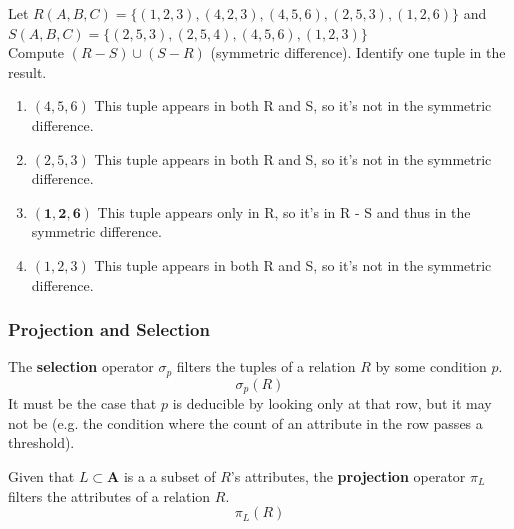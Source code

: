 \documentclass{article}
\begin{document}
      \begin{example}
        Let $R(A,B,C) = \{(1,2,3), (4,2,3), (4,5,6), (2,5,3), (1,2,6)\}$ and\\
        $S(A,B,C) = \{(2,5,3), (2,5,4), (4,5,6), (1,2,3)\}$\\
        Compute $(R - S) \cup (S - R)$ (symmetric difference). Identify one tuple in the result.

        \begin{enumerate}
          \item $(4,5,6)$ This tuple appears in both R and S, so it's not in the symmetric difference.
          
          \item $(2,5,3)$ This tuple appears in both R and S, so it's not in the symmetric difference.
          
          \item $\mathbf{(1,2,6)}$ This tuple appears only in R, so it's in R - S and thus in the symmetric difference.
          
          \item $(1,2,3)$ This tuple appears in both R and S, so it's not in the symmetric difference.
        \end{enumerate}
      \end{example}

    \subsubsection{Projection and Selection}

      \begin{definition}[Selection]
        The \textbf{selection} operator $\sigma_p$ filters the tuples of a relation $R$ by some condition $p$. 
        \begin{equation}
          \sigma_p (R)
        \end{equation}
        It must be the case that $p$ is deducible by looking only at that row, but it may not be (e.g. the condition where the count of an attribute in the row passes a threshold). 
      \end{definition}

      \begin{definition}[Projection]
        Given that $L \subset \mathbf{A}$ is a a subset of $R$'s attributes, the \textbf{projection} operator $\pi_L$ filters the attributes of a relation $R$. 
        \begin{equation}
          \pi_L (R)
        \end{equation}
      \end{definition}
\end{document}
